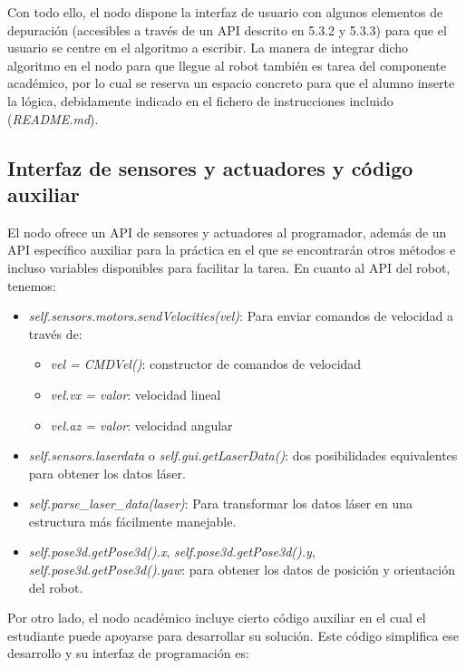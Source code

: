 Con todo ello, el nodo dispone la interfaz de usuario con algunos elementos de depuración (accesibles a través de un API descrito en 5.3.2 y 5.3.3) para que el usuario se centre en el algoritmo a escribir. La manera de integrar dicho algoritmo en el nodo para que llegue al robot también es tarea del componente académico, por lo cual se reserva un espacio concreto para que el alumno inserte la lógica, debidamente indicado en el fichero de instrucciones incluido (\textit{README.md}).

\subsection{Interfaz de sensores y actuadores y código auxiliar}
El nodo ofrece un API de sensores y actuadores al programador, además de un API específico auxiliar para la práctica en el que se encontrarán otros métodos e incluso variables disponibles para facilitar la tarea. En cuanto al API del robot, tenemos:

\begin{itemize}
	\item \textit{self.sensors.motors.sendVelocities(vel)}: Para enviar comandos de velocidad a través de:
    \begin{itemize}[label={$\diamond$}]
			\item \textit{vel = CMDVel()}: constructor de comandos de velocidad
       \item \textit{vel.vx = valor}: velocidad lineal
       \item \textit{vel.az = valor}: velocidad angular
    \end{itemize}
    \item \textit{self.sensors.laserdata} o \textit{self.gui.getLaserData()}: dos posibilidades equivalentes para obtener los datos láser.
    \item \textit{self.parse\_laser\_data(laser)}: Para transformar los datos láser en una estructura más fácilmente manejable.
		\item \textit{self.pose3d.getPose3d().x}, \textit{self.pose3d.getPose3d().y}, \textit{self.pose3d.getPose3d().yaw}: para obtener los datos de posición y orientación del robot.
\end{itemize}

Por otro lado, el nodo académico incluye cierto código auxiliar en el cual el estudiante puede apoyarse
para desarrollar su solución. Este código simplifica ese desarrollo y su interfaz de programación es:

